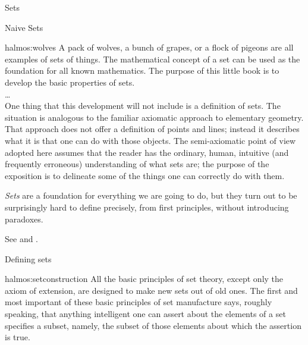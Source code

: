 \begin{plSection}{Sets}
\begin{plSection}{Naive Sets}
\begin{plQuote}
{}
{halmos:wolves}
{A pack of wolves, a bunch of grapes, or a flock of
pigeons are all examples of sets of things.
The mathematical concept of a set can be used as the foundation
for all known mathematics.
The purpose of this little book is to develop the basic properties
of sets.\\
\ldots \\
One thing that this development will not include is a definition
of sets.
The situation is analogous to the familiar axiomatic approach to
elementary geometry.
That approach does not offer a definition of points and lines;
instead it describes what it is that one can do with those
objects.
The semi-axiomatic point of view adopted here assumes that the
reader has the ordinary, human, intuitive (and frequently
erroneous) understanding of what sets are; the purpose of the
exposition is to delineate some of the things one can correctly do
with them.}%
\end{plQuote}

\emph{Sets} are a foundation for everything we are going to do,
but they turn out to be surprisingly hard to define precisely,
from first principles, without introducing paradoxes.

\vfill

\label{sec:math-sets}
\lstset{language=Clojure}

See 
and .

\begin{plSection}{Defining sets}

\begin{plQuote}
{}
{halmos:setconstruction}
{All the basic principles of set theory, except only the
axiom of extension, are designed to make new sets out of old ones.
The first and most important of these basic principles of set
manufacture says, roughly speaking, that anything intelligent one
can assert about the elements of a set specifies a subset, namely,
the subset of those elements about which the assertion is true.}
\end{plQuote}


\end{plSection}
\end{plSection}
\end{plSection}
